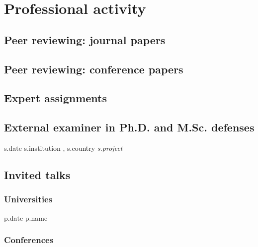 \documentclass[10pt,letterpaper]{article} %
\begin{document}
{{{{{{{{{{{{{{\section*{Professional activity}

\subsection*{Peer reviewing: journal papers}

{%

\subsection*{Peer reviewing: conference papers}

{%

\subsection*{Expert assignments}

{%

\subsection*{External examiner in Ph.D. and M.Sc. defenses}

{%
    { {{ s.date }} }
    {  }
    { {{ s.institution }}, {{ s.country }} }
    { {\it {{ s.project }} } }
{%


\subsection*{Invited talks}

\subsubsection*{Universities}
{%
    {%
    { {{ p.date }} }
    { {{ p.name }}  }
    { }{}
    {%
{%

\subsubsection*{Conferences}

}}}}}}}}}}}}}}}}}}}}}}}
\end{document}
